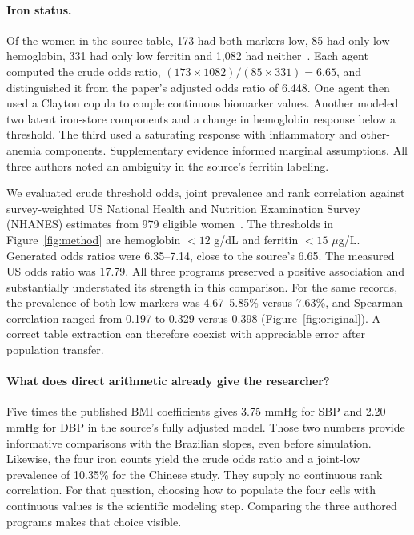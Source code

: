 \documentclass[sigconf,anonymous,review]{acmart}
\begin{document}
\paragraph{Iron status.}
Of the women in the source table, 173 had both markers low, 85 had only low hemoglobin, 331 had only low ferritin and 1,082 had neither~\cite{zhu}. Each agent computed the crude odds ratio, $(173\times1082)/(85\times331)=6.65$, and distinguished it from the paper's adjusted odds ratio of 6.448. One agent then used a Clayton copula to couple continuous biomarker values. Another modeled two latent iron-store components and a change in hemoglobin response below a threshold. The third used a saturating response with inflammatory and other-anemia components. Supplementary evidence informed marginal assumptions. All three authors noted an ambiguity in the source's ferritin labeling.

We evaluated crude threshold odds, joint prevalence and rank correlation against survey-weighted US National Health and Nutrition Examination Survey (NHANES) estimates from 979 eligible women~\cite{nhanes}. The thresholds in Figure~\ref{fig:method} are hemoglobin $<12$ g/dL and ferritin $<15$ $\mu$g/L. Generated odds ratios were 6.35--7.14, close to the source's 6.65. The measured US odds ratio was 17.79. All three programs preserved a positive association and substantially understated its strength in this comparison. For the same records, the prevalence of both low markers was 4.67--5.85\% versus 7.63\%, and Spearman correlation ranged from 0.197 to 0.329 versus 0.398 (Figure~\ref{fig:original}). A correct table extraction can therefore coexist with appreciable error after population transfer.

\paragraph{What does direct arithmetic already give the researcher?}
Five times the published BMI coefficients gives 3.75 mmHg for SBP and 2.20 mmHg for DBP in the source's fully adjusted model. Those two numbers provide informative comparisons with the Brazilian slopes, even before simulation. Likewise, the four iron counts yield the crude odds ratio and a joint-low prevalence of 10.35\% for the Chinese study. They supply no continuous rank correlation. For that question, choosing how to populate the four cells with continuous values is the scientific modeling step. Comparing the three authored programs makes that choice visible.
\end{document}
